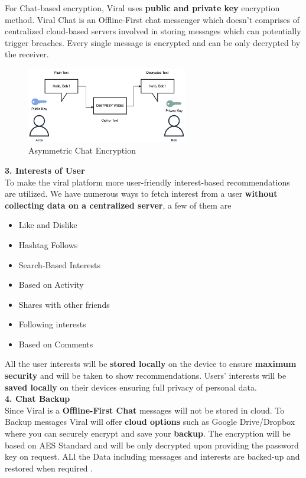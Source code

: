 \documentclass[conference]{IEEEtran}
\begin{document}
For Chat-based encryption, Viral uses \textbf{public and private key} encryption method. Viral Chat is an Offline-First chat messenger which doesn't comprises of centralized cloud-based servers involved in storing messages which can potentially trigger breaches. Every single message is encrypted and can be only decrypted by the receiver.\\

\begin{figure}[H]
\begin{center}
\includegraphics[width=7cm]{chat}
\caption{Asymmetric Chat Encryption}
\end{center}
\end{figure}

\textbf{3. Interests of User}\\


To make the viral platform more user-friendly interest-based recommendations are utilized. We have numerous ways to fetch interest from a user \textbf{without collecting data on a centralized server}, a few of them are
\begin{itemize}[wide, labelwidth=!, labelindent=0pt]
\item Like and Dislike
\item Hashtag Follows
\item Search-Based Interests
\item Based on Activity
\item Shares with other friends
\item Following interests
\item Based on Comments
\end{itemize}

All the user interests will be \textbf{stored locally} on the device to ensure \textbf{maximum security} and will be taken to show recommendations. Users' interests will be \textbf{saved locally} on their devices ensuring full privacy of personal data.\\

\textbf{4. Chat Backup}\\

Since Viral is a \textbf{Offline-First Chat} messages will not be stored in cloud. To Backup messages Viral will offer \textbf{cloud options} such as Google Drive/Dropbox where you can securely encrypt and save your \textbf{backup}. The encryption will be based on AES Standard and will be only decrypted upon providing the password key on request. ALl the Data including messages and interests are backed-up and restored when required .\\
\end{document}
